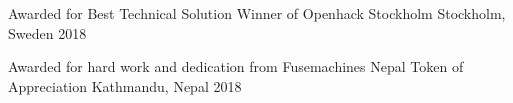 

\cvsubsection


\begin{cvhonors}

  \cvhonor
    {Awarded for Best Technical Solution} %
    {Winner of Openhack Stockholm} %
    {Stockholm, Sweden} %
    {2018} %

  \cvhonor
    {Awarded for hard work and dedication from Fusemachines Nepal} %
    {Token of Appreciation} %
    {Kathmandu, Nepal} %
    {2018} %

\end{cvhonors}

